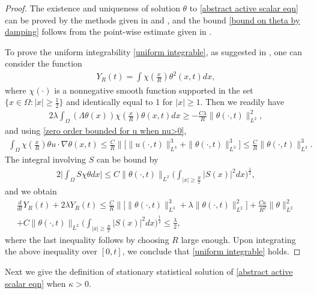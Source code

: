 \documentclass[reqno]{amsart}%
\theoremstyle{definition}
\theoremstyle{remark}
\numberwithin{equation}{section}
\newcommand{\1}{\mathbf{1}}
\numberwithin{equation}{section}
\numberwithin{theorem}{section}
\numberwithin{figure}{section}
\begin{document}
\begin{proof}
The existence and uniqueness of solution $\theta$ to \eqref{abstract active scalar eqn} can be proved by the methods given in \cite{FS18} and \cite{FS21}, and the bound \eqref{bound on theta by damping} follows from the point-wise estimate given in \cite{CV12}. 

To prove the uniform integrability \eqref{uniform integrable}, as suggested in \cite{CTV14b}, one can consider the function
\begin{align*}
Y_{R}(t)=\int \chi(\frac{x}{R})\theta^2(x,t)dx,
\end{align*}
where $\chi(\cdot)$ is a nonnegative smooth function supported in the set $\{x\in\Omega:|x|\ge\frac{1}{2}\}$ and identically equal to 1 for $|x|\ge1$. Then we readily have
\begin{align*}
2\lambda\int_{\Omega}(\Lambda\theta(x))\chi(\frac{x}{R})\theta(x,t)dx\ge-\frac{C\lambda}{R}\|\theta(\cdot,t)\|_{L^2}^2,
\end{align*}
and using \eqref{zero order bounded for u when nu>0}, 
\begin{align*}
\int_{\Omega}\chi(\frac{x}{R})\theta u\cdot\nabla\theta(x,t)\le \frac{C}{R}\|\Big[\|u(\cdot,t)\|_{L^3}^3+\|\theta(\cdot,t)\|_{L^3}^3\Big]\le \frac{C}{R}\|\theta(\cdot,t)\|_{L^3}^3.
\end{align*}
The integral involving $S$ can be bound by
\begin{align*}
2\Big|\int_{\Omega} S\chi\theta dx\Big|\le C\|\theta(\cdot,t)\|_{L^2}\Big(\int_{|x|\ge\frac{R}{2}}|S(x)|^2dx\Big)^\frac{1}{2},
\end{align*}
and we obtain
\begin{align*}
\frac{d}{dt} Y_{R}(t)+2\lambda Y_{R}(t)\le \frac{C}{R}\|\Big[\|\theta(\cdot,t)\|_{L^3}^3+\lambda\|\theta(\cdot,t)\|_{L^2}^2\Big]+\frac{C\kappa}{R^2}\|\theta\|_{L^2}^2\\
+C\|\theta(\cdot,t)\|_{L^2}\Big(\int_{|x|\ge\frac{R}{2}}|S(x)|^2dx\Big)^\frac{1}{2}\le \frac{\lambda}{2},
\end{align*}
where the last inequality follows by choosing $R$ large enough. Upon integrating the above inequality over $[0,t]$, we conclude that \eqref{uniform integrable} holds.
\end{proof}
Next we give the definition of stationary statistical solution of \eqref{abstract active scalar eqn} when $\kappa>0$.
\end{document}
